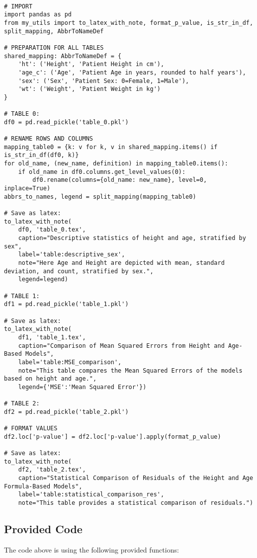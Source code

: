 \documentclass[11pt]{article}
\begin{document}
\begin{verbatim}

# IMPORT
import pandas as pd
from my_utils import to_latex_with_note, format_p_value, is_str_in_df, split_mapping, AbbrToNameDef

# PREPARATION FOR ALL TABLES
shared_mapping: AbbrToNameDef = {
    'ht': ('Height', 'Patient Height in cm'),
    'age_c': ('Age', 'Patient Age in years, rounded to half years'),
    'sex': ('Sex', 'Patient Sex: 0=Female, 1=Male'),
    'wt': ('Weight', 'Patient Weight in kg')
}

# TABLE 0:
df0 = pd.read_pickle('table_0.pkl')

# RENAME ROWS AND COLUMNS
mapping_table0 = {k: v for k, v in shared_mapping.items() if is_str_in_df(df0, k)} 
for old_name, (new_name, definition) in mapping_table0.items():
    if old_name in df0.columns.get_level_values(0):
        df0.rename(columns={old_name: new_name}, level=0, inplace=True)
abbrs_to_names, legend = split_mapping(mapping_table0)

# Save as latex:
to_latex_with_note(
    df0, 'table_0.tex',
    caption="Descriptive statistics of height and age, stratified by sex", 
    label='table:descriptive_sex',
    note="Here Age and Height are depicted with mean, standard deviation, and count, stratified by sex.",
    legend=legend)

# TABLE 1:
df1 = pd.read_pickle('table_1.pkl')

# Save as latex:
to_latex_with_note(
    df1, 'table_1.tex',
    caption="Comparison of Mean Squared Errors from Height and Age-Based Models", 
    label='table:MSE_comparison',
    note="This table compares the Mean Squared Errors of the models based on height and age.",
    legend={'MSE':'Mean Squared Error'})

# TABLE 2:
df2 = pd.read_pickle('table_2.pkl')

# FORMAT VALUES
df2.loc['p-value'] = df2.loc['p-value'].apply(format_p_value)

# Save as latex:
to_latex_with_note(
    df2, 'table_2.tex',
    caption="Statistical Comparison of Residuals of the Height and Age Formula-Based Models", 
    label='table:statistical_comparison_res',
    note="This table provides a statistical comparison of residuals.")

\end{verbatim}

\subsection{Provided Code}
The code above is using the following provided functions:
\end{document}
